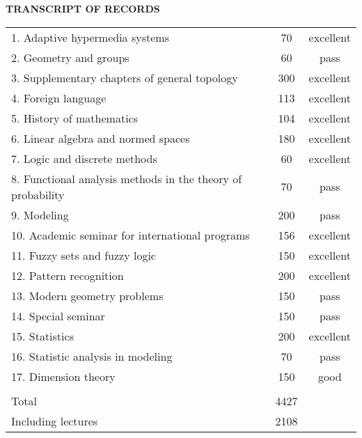 \documentclass{article}
\begin{document}
\begin{center}
    \large{\textbf{TRANSCRIPT OF RECORDS}}
\end{center}

\begin{tabular}{|l|c|c|}
\hline
1. Adaptive hypermedia systems & 70 & excellent\\
2. Geometry and groups         & 60 & pass\\
3. Supplementary chapters of general topology & 300 & excellent\\
4. Foreign language & 113 & excellent\\
5. History of mathematics & 104 & excellent\\
6. Linear algebra and normed spaces & 180 & excellent\\
7. Logic and discrete methods & 60 & excellent\\
8. Functional analysis methods in the theory of probability & 70 & pass\\
9. Modeling & 200 & pass\\
10. Academic seminar for international programs & 156 & excellent\\
11. Fuzzy sets and fuzzy logic & 150 & excellent\\
12. Pattern recognition & 200 & excellent\\
13. Modern geometry problems & 150 & pass\\
14. Special seminar & 150 & pass\\
15. Statistics & 200 & excellent\\
16. Statistic analysis in modeling & 70 & pass\\
17. Dimension theory & 150 & good\\
\dotfill & &\\
Total & 4427 &\\
Including lectures & 2108 &\\\hline
\end{tabular}\\
\end{document}
